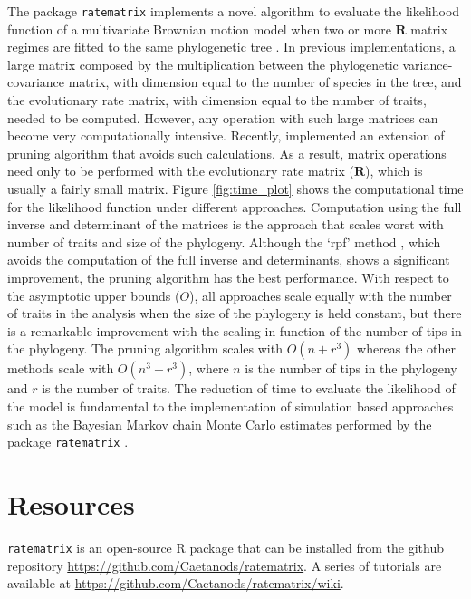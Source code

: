 The package \texttt{ratematrix} implements a novel algorithm to evaluate the likelihood function of a multivariate Brownian motion model when two or more $\mathbf{R}$ matrix regimes are fitted to the same phylogenetic tree \citep{caetano_sysbio_2017}. In previous implementations, a large matrix composed by the multiplication between the phylogenetic variance-covariance matrix, with dimension equal to the number of species in the tree, and the evolutionary rate matrix, with dimension equal to the number of traits, needed to be computed. However, any operation with such large matrices can become very computationally intensive. Recently, \citet{caetano_sysbio_2017} implemented an extension of \citet{felsenstein_1973} pruning algorithm that avoids such calculations. As a result, matrix operations need only to be performed with the evolutionary rate matrix ($\mathbf{R}$), which is usually a fairly small matrix. Figure \ref{fig:time_plot} shows the computational time for the likelihood function under different approaches. Computation using the full inverse and determinant of the matrices is the approach that scales worst with number of traits and size of the phylogeny. Although the `rpf' method \citep{Gustavson_rpf}, which avoids the computation of the full inverse and determinants, shows a significant improvement, the pruning algorithm has the best performance. With respect to the asymptotic upper bounds ($O$), all approaches scale equally with the number of traits in the analysis when the size of the phylogeny is held constant, but there is a remarkable improvement with the scaling in function of the number of tips in the phylogeny. The pruning algorithm scales with $O(n + r^{3})$ whereas the other methods scale with $O(n^{3} + r^{3})$, where $n$ is the number of tips in the phylogeny and $r$ is the number of traits. The reduction of time to evaluate the likelihood of the model is fundamental to the implementation of simulation based approaches such as the Bayesian Markov chain Monte Carlo estimates performed by the package \texttt{ratematrix} \citep{caetano_sysbio_2017}.

\section{ Resources }

\texttt{ratematrix} is an open-source R package that can be installed from the github repository \url{https://github.com/Caetanods/ratematrix}. A series of tutorials are available at \url{https://github.com/Caetanods/ratematrix/wiki}.

